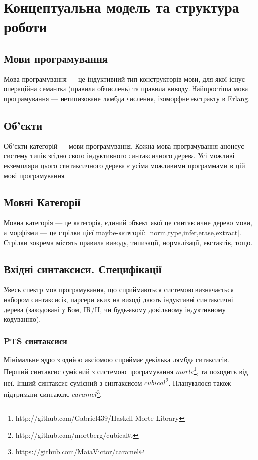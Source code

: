 \chapter{Концептуальна модель та структура роботи}

\section{Мови програмування}
Мова програмування --- це індуктивний тип конструкторів мови,
для якої існує операційна семантка (правила обчислень) та правила виводу.
Найпростіша мова програмування --- нетипизоване лямбда числення,
ізоморфне екстракту в Erlang.

\section{Об'єкти}
Об'єкти категорій --- мови програмування. Кожна мова програмування
анонсує систему типів згідно свого індуктивного синтаксичного дерева.
Усі можливі екземпляри цього синтаксичного дерева є усіма
можливими программами в цій мові програмування.

\section{Мовні Категорії}
Мовна категорія --- це категорія, єдиний объект якої це
синтаксичне дерево мови, а морфізми --- це стрілки
цієї maybe-категорії: [norm,type,infer,erase,extract]. Стрілки
зокрема містять правила виводу, типизації, нормалізації, екстактів, тощо.

\section{Вхідні синтаксиси. Специфікації}
Увесь спектр мов програмування, що сприймаються системою визначається набором
синтаксисів, парсери яких на виході дають індуктивні синтаксичні дерева
(закодовані у Бом, IR/II, чи будь-якому довільному індуктивному кодуванню).

\subsection{PTS синтаксиси}
Мінімальне ядро з однією аксіомою сприймає декілька лямбда ситаксисів.
Перший синтаксис сумісний з системою програмування
$morte$\footnote{http://github.com/Gabriel439/Haskell-Morte-Library}, та походить від неї.
Інший синтаксис сумісний з синтаксисом $cubical$\footnote{http://github.com/mortberg/cubicaltt}.
Планувалося також підтримати синтаксис $caramel$\footnote{https://github.com/MaiaVictor/caramel}.

